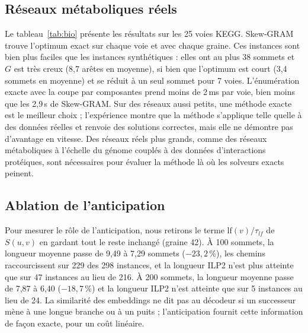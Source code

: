 \documentclass{llncs}
\begin{document}
\subsection{Réseaux métaboliques réels}
\label{sec:bio}

Le tableau~\ref{tab:bio} présente les résultats sur les 25 voies KEGG. Skew-GRAM trouve l'optimum exact sur chaque voie et avec chaque graine. Ces instances sont bien plus faciles que les instances synthétiques : elles ont au plus 38 sommets et $G$ est très creux (8,7 arêtes en moyenne), si bien que l'optimum est court (3,4 sommets en moyenne) et se réduit à un seul sommet pour 7 voies. L'énumération exacte avec la coupe par composantes prend moins de 2\,ms par voie, bien moins que les 2,9\,s de Skew-GRAM. Sur des réseaux aussi petits, une méthode exacte est le meilleur choix ; l'expérience montre que la méthode s'applique telle quelle à des données réelles et renvoie des solutions correctes, mais elle ne démontre pas d'avantage en vitesse. Des réseaux réels plus grands, comme des réseaux métaboliques à l'échelle du génome couplés à des données d'interactions protéiques, sont nécessaires pour évaluer la méthode là où les solveurs exacts peinent.

\begin{table}[t]
\centering
\caption{Résultats sur 25 voies métaboliques KEGG (cinq graines chacune). LP$(D)$ : nombre de sommets d'un plus long chemin de $D$. Optimum : optimum exact par énumération. Atteint : voies sur lesquelles Skew-GRAM atteint l'optimum (moyenne sur les graines). Les longueurs sont des moyennes.}
\label{tab:bio}

\end{table}

\subsection{Ablation de l'anticipation}

Pour mesurer le rôle de l'anticipation, nous retirons le terme $\mathrm{lf}(v)/\tau_{lf}$ de $S(u,v)$ en gardant tout le reste inchangé (graine 42). À 100 sommets, la longueur moyenne passe de 9,49 à 7,29 sommets ($-23{,}2$\,\%), les chemins raccourcissent sur 229 des 298 instances, et la longueur ILP2 n'est plus atteinte que sur 47 instances au lieu de 216. À 200 sommets, la longueur moyenne passe de 7,87 à 6,40 ($-18{,}7$\,\%) et la longueur ILP2 n'est atteinte que sur 5 instances au lieu de 24. La similarité des embeddings ne dit pas au décodeur si un successeur mène à une longue branche ou à un puits ; l'anticipation fournit cette information de façon exacte, pour un coût linéaire.
\end{document}
